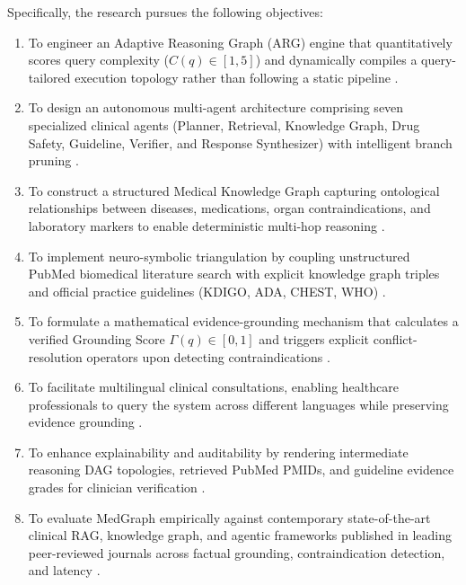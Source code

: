 \documentclass[conference]{IEEEtran}
\begin{document}
Specifically, the research pursues the following objectives:
\begin{enumerate}
    \item To engineer an Adaptive Reasoning Graph (ARG) engine that quantitatively scores query complexity ($C(q) \in [1, 5]$) and dynamically compiles a query-tailored execution topology rather than following a static pipeline \cite{WANG2025100504,LAWANNA2026100926}.
    
    \item To design an autonomous multi-agent architecture comprising seven specialized clinical agents (Planner, Retrieval, Knowledge Graph, Drug Safety, Guideline, Verifier, and Response Synthesizer) with intelligent branch pruning \cite{LAWANNA2026100926,ai6100240}.
    
    \item To construct a structured Medical Knowledge Graph capturing ontological relationships between diseases, medications, organ contraindications, and laboratory markers to enable deterministic multi-hop reasoning \cite{GARCIACARMONA2025,BAO2024102768}.
    
    \item To implement neuro-symbolic triangulation by coupling unstructured PubMed biomedical literature search with explicit knowledge graph triples and official practice guidelines (KDIGO, ADA, CHEST, WHO) \cite{info17020133,WANG2025100504,ZAKKA2024}.
    
    \item To formulate a mathematical evidence-grounding mechanism that calculates a verified Grounding Score $\Gamma(q) \in [0, 1]$ and triggers explicit conflict-resolution operators upon detecting contraindications \cite{LAWANNA2026100926,info17020133}.
    
    \item To facilitate multilingual clinical consultations, enabling healthcare professionals to query the system across different languages while preserving evidence grounding \cite{hema2026voice}.
    
    \item To enhance explainability and auditability by rendering intermediate reasoning DAG topologies, retrieved PubMed PMIDs, and guideline evidence grades for clinician verification \cite{LAWANNA2026100926,THIRUNAVUKARASU2023}.
    
    \item To evaluate MedGraph empirically against contemporary state-of-the-art clinical RAG, knowledge graph, and agentic frameworks published in leading peer-reviewed journals across factual grounding, contraindication detection, and latency \cite{ai6100240,info17020133,WANG2025100504,ALKHALAF2024104662}.
\end{enumerate}
\end{document}
